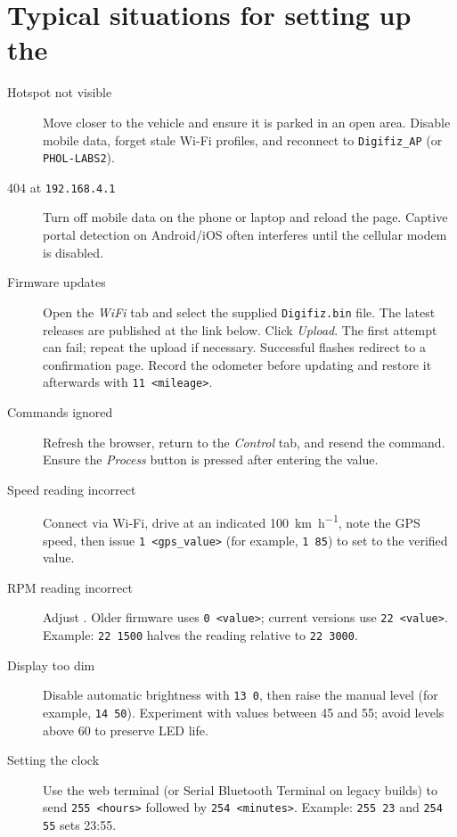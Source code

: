 \chapter{Typical situations for setting up the \ReplicaNextLong{}}\label{ch:replica-next-scenarios}

\begin{description}
    \item[Hotspot not visible] Move closer to the vehicle and ensure it is parked in an open area. Disable mobile data, forget stale Wi-Fi profiles, and reconnect to \texttt{Digifiz\_AP} (or \texttt{PHOL-LABS2}).
    \item[404 at \texttt{192.168.4.1}] Turn off mobile data on the phone or laptop and reload the page. Captive portal detection on Android/iOS often interferes until the cellular modem is disabled.
    \item[Firmware updates] Open the \emph{WiFi} tab and select the supplied \texttt{Digifiz.bin} file. The latest releases are published at the link below.
        Click \emph{Upload}. The first attempt can fail; repeat the upload if necessary. Successful flashes redirect to a confirmation page. Record the odometer before updating and restore it afterwards with \verb|11 <mileage>|.
    \item[Commands ignored] Refresh the browser, return to the \emph{Control} tab, and resend the command. Ensure the \emph{Process} button is pressed after entering the value.
    \item[Speed reading incorrect] Connect via Wi-Fi, drive at an indicated \SI{100}{\kilo\metre\per\hour}, note the GPS speed, then issue \verb|1 <gps_value>| (for example, \verb|1 85|) to set  to the verified value.
    \item[RPM reading incorrect] Adjust . Older firmware uses \verb|0 <value>|; current versions use \verb|22 <value>|. Example: \verb|22 1500| halves the reading relative to \verb|22 3000|.
    \item[Display too dim] Disable automatic brightness with \verb|13 0|, then raise the manual level (for example, \verb|14 50|). Experiment with values between 45 and 55; avoid levels above 60 to preserve LED life.
    \item[Setting the clock] Use the web terminal (or Serial Bluetooth Terminal on legacy builds) to send \verb|255 <hours>| followed by \verb|254 <minutes>|. Example: \verb|255 23| and \verb|254 55| sets 23:55.

\end{description}
